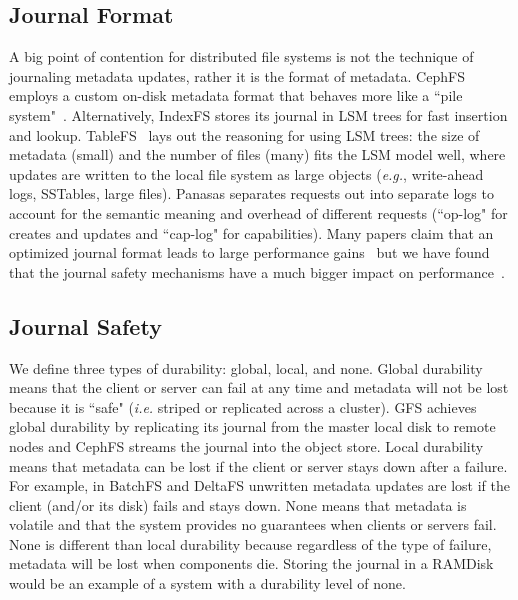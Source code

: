 \subsection{Journal Format}

A big point of contention for distributed file systems is not the technique of
journaling metadata updates, rather it is the format of metadata. CephFS
employs a custom on-disk metadata format that behaves more like a ``pile
system"~\cite{weil:phdthesis07}. Alternatively, IndexFS stores its journal in
LSM trees for fast insertion and lookup.  TableFS~\cite{ren:atc2013-tablefs}
lays out the reasoning for using LSM trees: the size of metadata (small) and
the number of files (many) fits the LSM model well, where updates are written
to the local file system as large objects ({\it e.g.}, write-ahead logs,
SSTables, large files). Panasas separates requests out into separate logs to
account for the semantic meaning and overhead of different requests (``op-log"
for creates and updates and ``cap-log" for capabilities).  Many papers claim
that an optimized journal format leads to large performance
gains~\cite{ren:atc2013-tablefs, ren:sc2014-indexfs, zheng:pdsw2014-batchfs}
but we have found that the journal safety mechanisms have a much bigger impact
on performance~\cite{sevilla:ipdps18-cudele}.

\subsection{Journal Safety}

We define three types of durability: global, local, and none.  Global
durability means that the client or server can fail at any time and metadata
will not be lost because it is ``safe" ({\it i.e.} striped or replicated across
a cluster). GFS achieves global durability by replicating its journal from the
master local disk to remote nodes and CephFS streams the journal into the
object store. Local durability means that metadata can be lost if the client or
server stays down after a failure. For example, in BatchFS and DeltaFS
unwritten metadata updates are lost if the client (and/or its disk) fails and
stays down.  None means that metadata is volatile and that the system provides
no guarantees when clients or servers fail.  None is different than local
durability because regardless of the type of failure, metadata will be lost
when components die. Storing the journal in a RAMDisk would be an example of a
system with a durability level of none.

